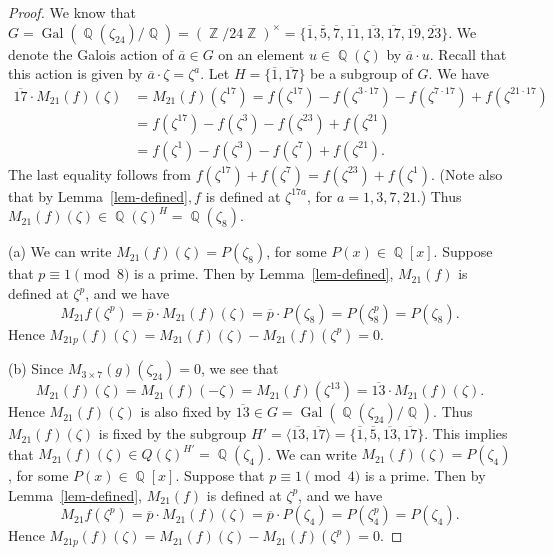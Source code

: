 \documentclass[12t,a4paper]{amsart}
\theoremstyle{definition}
\DeclareMathOperator{\Z}{\mathbb{Z}}
\DeclareMathOperator{\Q}{\mathbb{Q}}
\DeclareMathOperator{\Gal}{\text{Gal}}
\numberwithin{equation}{section}
\begin{document}
{\begin{proof}
We know that $G=\Gal(\Q(\zeta_{24})/\Q)=(\Z/24\Z)^\times=\{\overline{1},\overline{5},\overline{7},\overline{11},\overline{13},\overline{17},\overline{19},\overline{23}\}$. We denote the Galois action of $\overline{a}\in G$ on an element $u\in \Q(\zeta)$ by $\overline{a}\cdot u$. Recall that this action is given by $\overline{a}\cdot \zeta=\zeta^a$. Let $H=\{\overline{1},\overline{17}\}$ be a subgroup of $G$. 
We have
\[
\begin{aligned}
\overline{17}\cdot M_{21}(f)(\zeta)&=M_{21}(f)(\zeta^{17})=f(\zeta^{17})-f(\zeta^{3\cdot 17})-f(\zeta^{7\cdot 17})+f(\zeta^{21\cdot 17})\\
&=f(\zeta^{17})-f(\zeta^{3})-f(\zeta^{23})+f(\zeta^{21})\\
&=f(\zeta^{1})-f(\zeta^{3})-f(\zeta^{7})+f(\zeta^{21}).
\end{aligned}
\]
The last equality follows from $f(\zeta^{17})+f(\zeta^{7})=f(\zeta^{23})+f(\zeta^{1})$.  (Note also that by Lemma~\ref{lem-defined}$, f$ is defined at $\zeta^{17a}$, for $a=1,3,7,21$.) Thus $M_{21}(f)(\zeta)\in \Q(\zeta)^H= \Q(\zeta_{8})$. 


(a) We can write $M_{21}(f)(\zeta)= P(\zeta_8)$, for some $P(x)\in \Q[x]$. Suppose that $p\equiv 1 \pmod 8$ is a prime. Then by Lemma~\ref{lem-defined}, $M_{21}(f)$ is defined at $\zeta^p$, and we have 
\[M_{21}f(\zeta^p)=\overline{p} \cdot M_{21}(f)(\zeta) = \overline{p}\cdot P(\zeta_8)=P(\zeta_8^p)=P(\zeta_8).\]
Hence $M_{21p}(f)(\zeta)=M_{21}(f)(\zeta)-M_{21}(f)(\zeta^p)=0$.

(b) Since $M_{3\times 7}(g)(\zeta_{24})=0$, we see that
    \[
    M_{21}(f)(\zeta)=M_{21}(f)(-\zeta)=M_{21}(f)(\zeta^{13})= \overline{13} \cdot M_{21}(f)(\zeta).
    \]
    Hence $M_{21}(f)(\zeta)$ is also fixed by $\overline{13}\in G=\Gal(\Q(\zeta_{24})/\Q)$. Thus $M_{21}(f)(\zeta)$ is fixed by the subgroup $H'=\langle \overline{13},\overline{17}\rangle =\{\overline{1},\overline{5},\overline{13},\overline{17}\}$. This implies that $M_{21}(f)(\zeta)\in Q(\zeta)^{H'}=\Q(\zeta_4)$.  We can write $M_{21}(f)(\zeta)= P(\zeta_4)$, for some $P(x)\in \Q[x]$. Suppose that $p\equiv 1 \pmod 4$ is a prime. Then by Lemma~\ref{lem-defined}, $M_{21}(f)$ is defined at $\zeta^p$, and we have 
\[M_{21}f(\zeta^p)=\overline{p} \cdot M_{21}(f)(\zeta) = \overline{p}\cdot P(\zeta_4)=P(\zeta_4^p)=P(\zeta_4).\]
Hence $M_{21p}(f)(\zeta)=M_{21}(f)(\zeta)-M_{21}(f)(\zeta^p)=0$.
\end{proof}





}
\end{document}
